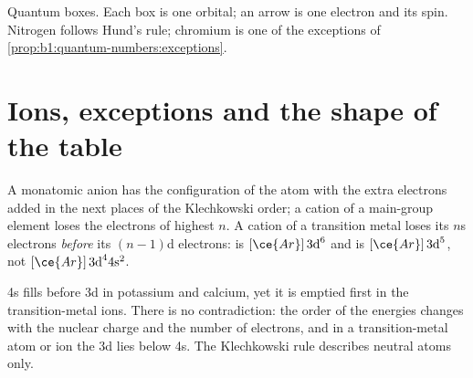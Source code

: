 \begin{omfigure}

{\small Quantum boxes. Each box is one orbital; an arrow is one electron
and its spin. Nitrogen follows Hund's rule; chromium is one of the
exceptions of \cref{prop:b1:quantum-numbers:exceptions}.}
\end{omfigure}

\section{Ions, exceptions and the shape of the table}

\begin{proposition}\label{prop:b1:quantum-numbers:ions}
A monatomic anion has the configuration of the atom with the extra
electrons added in the next places of the Klechkowski order; a cation of a
main-group element loses the electrons of highest $n$. A cation of a
transition metal loses its $n$s electrons \emph{before} its
$(n-1)$d electrons:  is $[\ce{Ar}]\,3\text{d}^6$ and
 is $[\ce{Ar}]\,3\text{d}^5$, not $[\ce{Ar}]\,3\text{d}^4
4\text{s}^2$.
\end{proposition}
\admitted

\begin{remark}\label{rem:b1:quantum-numbers:order}
4s fills before 3d in potassium and calcium, yet it is emptied first in
the transition-metal ions. There is no contradiction: the order of the
 energies changes with the nuclear charge and the number of
electrons, and in a transition-metal atom or ion the 3d  lies
below 4s. The Klechkowski rule describes neutral atoms only.
\end{remark}

